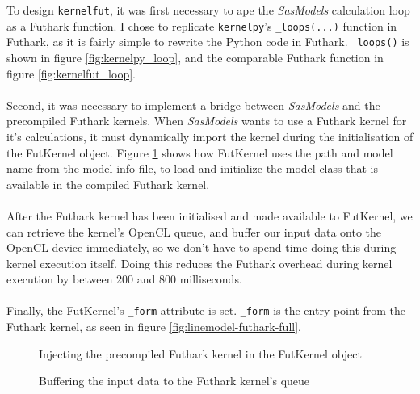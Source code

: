 \documentclass[11pt]{article}
\newcommand{\sasmodels}{\textit{SasModels}}
\begin{document}
To design \texttt{kernelfut}, it was first necessary to ape the 
\sasmodels{} calculation loop as a Futhark function. 
I chose to replicate \texttt{kernelpy}'s \texttt{\_loops(...)} function in 
Futhark, as it is fairly simple to rewrite the Python code in Futhark.
\texttt{\_loops()} is shown in figure \ref{fig:kernelpy_loop}, and the
comparable Futhark function in figure \ref{fig:kernelfut_loop}.
\\\\
Second, it was necessary to implement a bridge between \sasmodels{} and the 
precompiled Futhark kernels. 
When \sasmodels{} wants to use a Futhark kernel for it's calculations, 
it must dynamically import the kernel during the initialisation of the FutKernel
object. Figure \ref{fig:retrieving-futhark-class} shows how FutKernel uses
the path and model name from the model info file, to load and initialize the
model class that is available in the compiled Futhark kernel.
\\\\
After the Futhark kernel has been initialised and made available to FutKernel,
we can retrieve the kernel's OpenCL queue, and buffer our input data onto the 
OpenCL device immediately, so we don't have to spend time doing this during 
kernel execution itself.
Doing this reduces the Futhark overhead during kernel execution by between
200 and 800 milliseconds.
\\\\
Finally, the FutKernel's \texttt{\_form} attribute is set. \texttt{\_form} is the entry point from
the Futhark kernel, as seen in figure \ref{fig:linemodel-futhark-full}.

\begin{figure}
  
  \caption{Injecting the precompiled Futhark kernel in the FutKernel object}
  \label{fig:retrieving-futhark-class}
\end{figure}


\begin{figure}
  
  \caption{Buffering the input data to the Futhark kernel's queue}
  \label{fig:buffering-kernelfut}
\end{figure}
\end{document}
